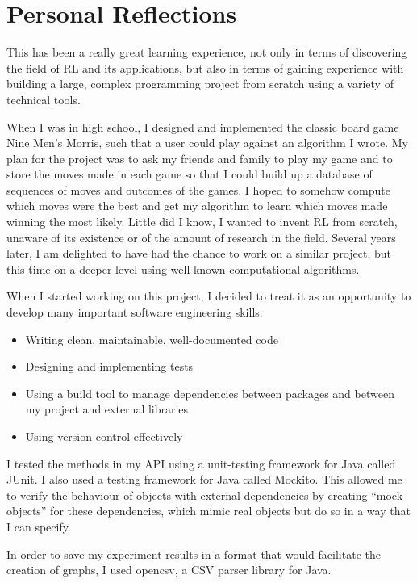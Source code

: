 \documentclass[11pt,a4paper]{report}
\begin{document}
\section{Personal Reflections}

This has been a really great learning experience, not only in terms of discovering the field of RL and its applications, but also in terms of gaining experience with building a large, complex programming project from scratch using a variety of technical tools.

When I was in high school, I designed and implemented the classic board game Nine Men’s Morris, such that a user could play against an algorithm I wrote. My plan for the project was to ask my friends and family to play my game and to store the moves made in each game so that I could build up a database of sequences of moves and outcomes of the games. I hoped to somehow compute which moves were the best and get my algorithm to learn which moves made winning the most likely. Little did I know, I wanted to invent RL from scratch, unaware of its existence or of the amount of research in the field. Several years later, I am delighted to have had the chance to work on a similar project, but this time on a deeper level using well-known computational algorithms.

When I started working on this project, I decided to treat it as an opportunity to develop many important software engineering skills:

\begin{itemize}
	\item Writing clean, maintainable, well-documented code
	\item Designing and implementing tests
	\item Using a build tool to manage dependencies between packages and between my project and external libraries
	\item Using version control effectively
\end{itemize}

I tested the methods in my API using a unit-testing framework for Java called JUnit. I also used a testing framework for Java called Mockito. This allowed me to verify the behaviour of objects with external dependencies by creating “mock objects” for these dependencies, which mimic real objects but do so in a way that I can specify.

In order to save my experiment results in a format that would facilitate the creation of graphs, I used opencsv, a CSV parser library for Java.
\end{document}
